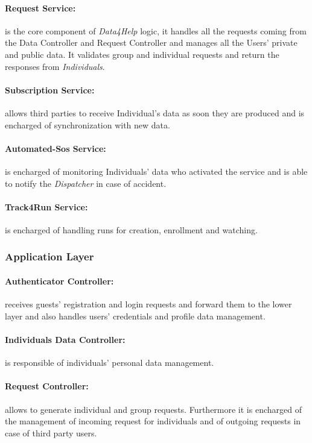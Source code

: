 \documentclass[a4paper]{article}
\begin{document}
    \paragraph{Request Service:}
    is the core component of \textit{Data4Help} logic, it handles all the requests coming from the Data Controller and Request Controller and manages all the Users' private and public data. It validates group and individual requests and return the responses from \textit{Individuals}.
    
    \paragraph{Subscription Service:}
    allows third parties to receive Individual's data as soon they are produced and is encharged of synchronization with new data.
    
    \paragraph{Automated-Sos Service:}
    is encharged of monitoring Individuals' data who activated the service and is able to notify the \textit{Dispatcher} in case of accident.
    
    \paragraph{Track4Run Service:}
    is encharged of handling runs for creation, enrollment and watching.
    
    \subsubsection{Application Layer}
    
    \paragraph{Authenticator Controller:}
    receives guests' registration and login requests and forward them to the lower layer and also handles users' credentials and profile data management.
    
    \paragraph{Individuals Data Controller:}
    is responsible of individuals' personal data management.
    
    \paragraph{Request Controller:}
    allows to generate individual and group requests. Furthermore it is encharged of the management of incoming request for individuals and of outgoing requests in case of third party users.
    
\end{document}
